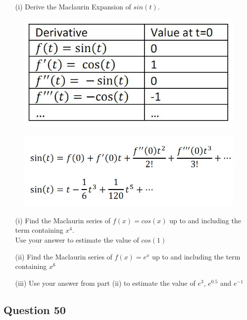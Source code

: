 \documentclass[]{article}
\begin{document}
\begin{itemize}
	\item[(i)] Derive the Maclaurin Expansion of $sin(t)$.
\end{itemize}
\begin{figure}[h!]
	\centering
	\includegraphics[width=0.45\linewidth]{macl1}
\end{figure}
\begin{figure}[h!]
	\centering
	\includegraphics[width=0.65\linewidth]{macl2}
\end{figure}


%

\begin{itemize}
	\item[(i)]Find the Maclaurin series of $f(x) = cos(x)$ up to and including the term
	containing $x^4$.
	\\
	Use your answer to estimate the value of $cos(1)$
	\item[(ii)] Find the Maclaurin series of $f(x) =e^x$ up to and including the term containing
	$x^6$
	\item[(iii)] Use your answer from part (ii) to estimate the value of $e^3$, $e^{0.5}$ and $e^{-1}$
\end{itemize}
\newpage

\subsection*{Question 50}

\end{document}
